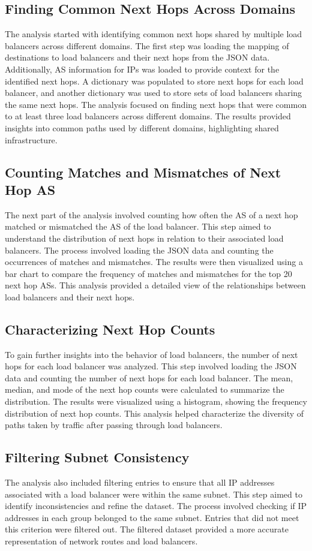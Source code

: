 \documentclass[12pt]{cwru_thesis}
\begin{document}
\subsection{Finding Common Next Hops Across Domains}
The analysis started with identifying common next hops shared by multiple load balancers across different domains. The first step was loading the mapping of destinations to load balancers and their next hops from the JSON data. Additionally, AS information for IPs was loaded to provide context for the identified next hops. A dictionary was populated to store next hops for each load balancer, and another dictionary was used to store sets of load balancers sharing the same next hops. The analysis focused on finding next hops that were common to at least three load balancers across different domains. The results provided insights into common paths used by different domains, highlighting shared infrastructure.

\subsection{Counting Matches and Mismatches of Next Hop AS}
The next part of the analysis involved counting how often the AS of a next hop matched or mismatched the AS of the load balancer. This step aimed to understand the distribution of next hops in relation to their associated load balancers. The process involved loading the JSON data and counting the occurrences of matches and mismatches. The results were then visualized using a bar chart to compare the frequency of matches and mismatches for the top 20 next hop ASs. This analysis provided a detailed view of the relationships between load balancers and their next hops.

\subsection{Characterizing Next Hop Counts}
To gain further insights into the behavior of load balancers, the number of next hops for each load balancer was analyzed. This step involved loading the JSON data and counting the number of next hops for each load balancer. The mean, median, and mode of the next hop counts were calculated to summarize the distribution. The results were visualized using a histogram, showing the frequency distribution of next hop counts. This analysis helped characterize the diversity of paths taken by traffic after passing through load balancers.

\subsection{Filtering Subnet Consistency}
The analysis also included filtering entries to ensure that all IP addresses associated with a load balancer were within the same subnet. This step aimed to identify inconsistencies and refine the dataset. The process involved checking if IP addresses in each group belonged to the same subnet. Entries that did not meet this criterion were filtered out. The filtered dataset provided a more accurate representation of network routes and load balancers.
\end{document}
